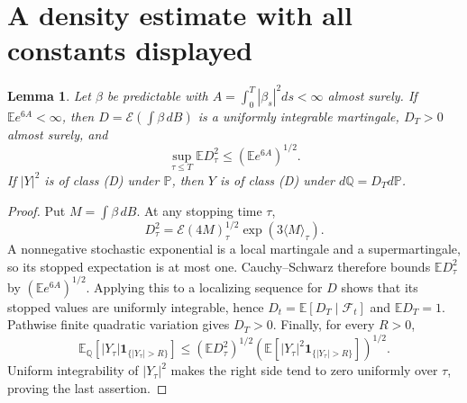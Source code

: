 \documentclass[11pt]{article}
\newtheorem{lemma}[theorem]{Lemma}
\newcommand{\E}{\mathbb E}
\newcommand{\Prb}{\mathbb P}
\newcommand{\Q}{\mathbb Q}
\newcommand{\F}{\mathcal F}
\newcommand{\Ind}{\mathbf 1}
\begin{document}
\section{A density estimate with all constants displayed}
\begin{lemma}\label{density}
Let $\beta$ be predictable with $A=\int_0^T|\beta_s|^2ds<\infty$
almost surely. If $\E e^{6A}<\infty$, then
$D=\mathcal E(\int\beta\,dB)$ is a uniformly integrable martingale,
$D_T>0$ almost surely, and
\[
 \sup_{\tau\leq T}\E D_\tau^2\leq(\E e^{6A})^{1/2}.
\]
If $|Y|^2$ is of class (D) under $\Prb$, then $Y$ is of class (D)
under $d\Q=D_Td\Prb$.
\end{lemma}
\begin{proof}
Put $M=\int\beta\,dB$. At any stopping time $\tau$,
\[
 D_\tau^2
 =\mathcal E(4M)_\tau^{1/2}\exp(3\langle M\rangle_\tau).
\]
A nonnegative stochastic exponential is a local martingale and a
supermartingale, so its stopped expectation is at most one.
Cauchy--Schwarz therefore bounds $\E D_\tau^2$ by
$(\E e^{6A})^{1/2}$. Applying this to a localizing sequence for $D$
shows that its stopped values are uniformly integrable, hence
$D_t=\E[D_T\mid\F_t]$ and $\E D_T=1$. Pathwise finite quadratic
variation gives $D_T>0$.
Finally, for every $R>0$,
\[
 \E_\Q[|Y_\tau|\Ind_{\{|Y_\tau|>R\}}]
 \leq(\E D_\tau^2)^{1/2}
       (\E[|Y_\tau|^2\Ind_{\{|Y_\tau|>R\}}])^{1/2}.
\]
Uniform integrability of $|Y_\tau|^2$ makes the right side tend to zero
uniformly over $\tau$, proving the last assertion.
\end{proof}
\end{document}
